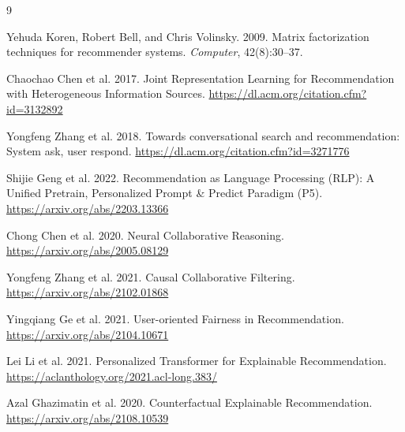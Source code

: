 \documentclass[sigconf,authordraft,nonacm]{acmart}
\begin{document}

\begin{thebibliography}{9}

Yehuda Koren, Robert Bell, and Chris Volinsky. 2009.
\newblock Matrix factorization techniques for recommender systems.
\newblock \emph{Computer}, 42(8):30--37.

Chaochao Chen et al. 2017.
\newblock Joint Representation Learning for Recommendation with Heterogeneous Information Sources.
\newblock \url{https://dl.acm.org/citation.cfm?id=3132892}

Yongfeng Zhang et al. 2018.
\newblock Towards conversational search and recommendation: System ask, user respond.
\newblock \url{https://dl.acm.org/citation.cfm?id=3271776}

Shijie Geng et al. 2022.
\newblock Recommendation as Language Processing (RLP): A Unified Pretrain, Personalized Prompt \& Predict Paradigm (P5).
\newblock \url{https://arxiv.org/abs/2203.13366}

Chong Chen et al. 2020.
\newblock Neural Collaborative Reasoning.
\newblock \url{https://arxiv.org/abs/2005.08129}

Yongfeng Zhang et al. 2021.
\newblock Causal Collaborative Filtering.
\newblock \url{https://arxiv.org/abs/2102.01868}

Yingqiang Ge et al. 2021.
\newblock User-oriented Fairness in Recommendation.
\newblock \url{https://arxiv.org/abs/2104.10671}

Lei Li et al. 2021.
\newblock Personalized Transformer for Explainable Recommendation.
\newblock \url{https://aclanthology.org/2021.acl-long.383/}

Azal Ghazimatin et al. 2020.
\newblock Counterfactual Explainable Recommendation.
\newblock \url{https://arxiv.org/abs/2108.10539}

\end{thebibliography}
\end{document}
